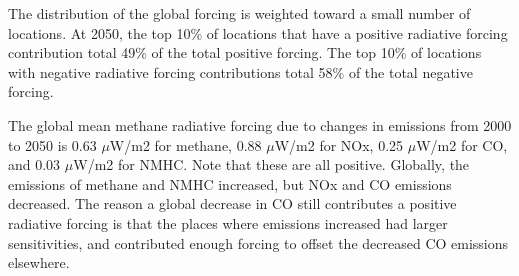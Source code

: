 The distribution of the global forcing is weighted toward a small number of locations. At 2050, the top 10\% of locations that have a positive radiative forcing contribution total 49\% of the total positive forcing. The top 10\% of locations with negative radiative forcing contributions total 58\% of the total negative forcing.

The global mean methane radiative forcing due to changes in emissions from 2000 to 2050 is 0.63 $\mu$W/m2 for methane, 0.88 $\mu$W/m2 for NOx, 0.25 $\mu$W/m2 for CO, and 0.03 $\mu$W/m2 for NMHC. Note that these are all positive. Globally, the emissions of methane and NMHC increased, but NOx and CO emissions decreased. The reason a global decrease in CO still contributes a positive radiative forcing is that the places where emissions increased had larger sensitivities, and contributed enough forcing to offset the decreased CO emissions elsewhere.

